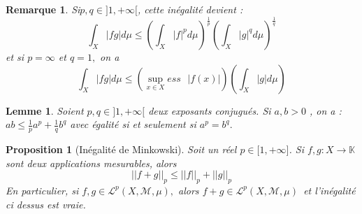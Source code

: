 \documentclass[3pt]{article}
\newtheorem{lemma}[theorem]{Lemme}
\newtheorem{proposition}[theorem]{Proposition}
\newtheorem{remark}[theorem]{Remarque}
\begin{document}
\bigskip 

\begin{remark}
Si$p,q\in ]1,+\infty \lbrack $, cette in\'{e}galit\'{e} devient :%
\begin{equation*}
\int_{X}|fg|d\mu \leq \left( \int_{X}\left\vert f\right\vert ^{p}d\mu
\right) ^{\frac{1}{p}}\left( \int_{X}\left\vert g\right\vert ^{q}d\mu
\right) ^{\frac{1}{q}}
\end{equation*}%
et si $p=\infty $ et $q=1,$ on a 
\begin{equation*}
\int_{X}|fg|d\mu \leq \left( \underset{x\in X}{\sup }ess\text{ }\left\vert
f(x)\right\vert \right) \left( \int_{X}\left\vert g\right\vert d\mu \right) 
\end{equation*}
\end{remark}

\bigskip 

\begin{lemma}
Soient $p,q\in ]1,+\infty \lbrack $ deux exposants conjugu\'{e}s. Si $a,b>0$%
, on a : $ab\leq \frac{1}{p}a^{p}+\frac{1}{q}b^{q}$ avec \'{e}galit\'{e} si
et seulement si $a^{p}=b^{q}.$
\end{lemma}

\bigskip 

\begin{proposition}[In\'{e}galit\'{e} de Minkowski]
Soit un r\'{e}el $p\in \lbrack 1,+\infty ]$. Si $f,g:X\rightarrow \mathbb{K}$
sont deux applications mesurables, alors%
\begin{equation*}
\left\vert \left\vert f+g\right\vert \right\vert _{p}\leq \left\vert
\left\vert f\right\vert \right\vert _{p}+\left\vert \left\vert g\right\vert
\right\vert _{p}
\end{equation*}%
En particulier, si  $f,g\in \mathcal{L}^{p}(X,\mathcal{M},\mu ),$ alors $%
f+g\in \mathcal{L}^{p}(X,\mathcal{M},\mu )$\ et l'in\'{e}galit\'{e} ci
dessus est vraie.
\end{proposition}

\bigskip 
\end{document}
